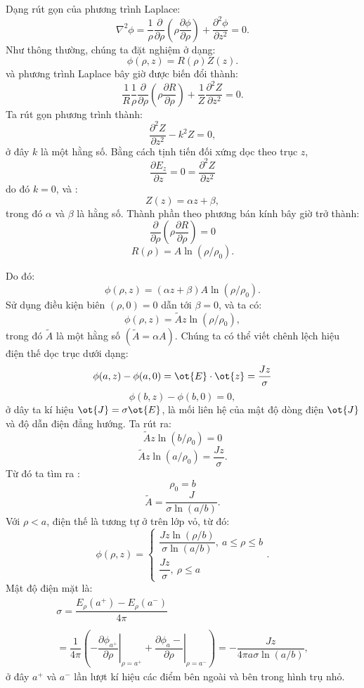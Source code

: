 \begin{loigiai}
\begin{center}
\begin{tikzpicture}[x=0.75pt,y=0.75pt,yscale=-1,xscale=1]
\end{tikzpicture}
\end{center}
 
Dạng rút gọn của phương trình Laplace:
     $$\nabla^{2} \phi=\dfrac{1}{\rho} \dfrac{\partial}{\partial \rho}\left(\rho \dfrac{\partial \phi}{\partial \rho}\right)+\dfrac{\partial^{2} \phi}{\partial z^{2}}=0.$$
Như thông thường, chúng ta đặt nghiệm ở dạng:
     $$\phi(\rho,z) = R(\rho)Z(z).$$
và phương trình Laplace bây giờ được biến đổi thành:
   $$\dfrac{1}{R} \dfrac{1}{\rho} \dfrac{\partial}{\partial \rho} \left(\rho \dfrac{\partial R}{\partial \rho}\right) + \dfrac{1}{Z} \dfrac{\partial^2Z}{\partial z^2} = 0.$$
Ta rút gọn phương trình thành:
    $$\dfrac{\partial^2 Z}{\partial z^2} - k^2Z = 0,$$
ở đây $k$ là một hằng số. Bằng cách tịnh tiến đối xứng dọc theo trục $z$,
  $$\dfrac{\partial E_z}{\partial z} = 0 = \dfrac{\partial^2 Z}{\partial z^2}$$
do đó $k=0$, và :
  $$Z(z) = \alpha z + \beta,$$
trong đó $\alpha$ và $\beta$ là hằng số. Thành phần theo phương bán kính bây giờ trở thành:
 $$\dfrac{\partial}{\partial\rho} \left(\rho\dfrac{\partial R}{\partial\rho}\right) = 0$$
 $$R(\rho) = A\ln(\rho/\rho_0).$$
 
Do đó:
   $$\phi(\rho,z) = (\alpha z + \beta)A\ln(\rho/\rho_0).$$
Sử dụng điều kiện biên $(\rho,0) = 0$ dẫn tới $\beta = 0$, và ta có:
   $$\phi(\rho,z) = \tilde{A}z\ln(\rho/\rho_0),$$
trong đó $\tilde{A}$ là một hằng số $(\tilde{A} = \alpha A)$. Chúng ta có thể viết chênh lệch hiệu điện thế dọc trục dưới dạng:
 $$\phi(a,z) - \phi(a,0) = \ot{E}\cdot \ot{z} = \dfrac{Jz}{\sigma}$$
 $$\phi(b,z) - \phi(b,0) = 0,$$
ở dây ta kí hiệu $\ot{J} = \sigma\ot{E}$, là mối liên hệ của mật độ dòng điện $\ot{J}$ và độ dẫn điện đẳng hướng. Ta rút ra:
  $$\tilde{A} z \ln(b/\rho_0) = 0$$
   $$\tilde{A} z \ln(a/\rho_0) = \dfrac{Jz}{\sigma}.$$
Từ đó ta tìm ra :
   $$\rho_0 = b$$
   $$ \tilde{A} = \dfrac{J}{\sigma \ln(a/b)}.$$
Với $\rho < a$, điện thế là tương tự ở trên lớp vỏ, từ đó:
   $$\phi(\rho, z)=\left\{
   \begin{aligned}
\dfrac{J z \ln (\rho / b)}{\sigma \ln (a / b)} ,~ a \leq \rho \leq b \\
\dfrac{J z}{\sigma} ,~ \rho \leq a
\end{aligned}\right. .$$
Mật độ điện mặt là:
  $$\begin{array}{c}
\sigma=\dfrac{E_{\rho}\left(a^{+}\right)-E_{\rho}\left(a^{-}\right)}{4 \pi} \\
\\=\dfrac{1}{4 \pi}\left(-\left.\dfrac{\partial \phi_{a^{+}}}{\partial \rho}\right|_{\rho=a^{+}}+\left.\dfrac{\partial \phi_{a}-}{\partial \rho}\right|_{\rho=a^{-}}\right)=-\dfrac{J z}{4 \pi a \sigma \ln (a / b)},
\end{array}$$
ở đây $a^+$ và $a^-$ lần lượt kí hiệu các điểm bên ngoài và bên trong hình trụ nhỏ.


\end{loigiai}


